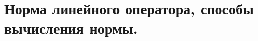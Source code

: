 \documentclass[../main.tex]{subfiles}
\begin{document}
\newpage
\section{Норма линейного оператора, способы вычисления нормы.}
\end{document}

